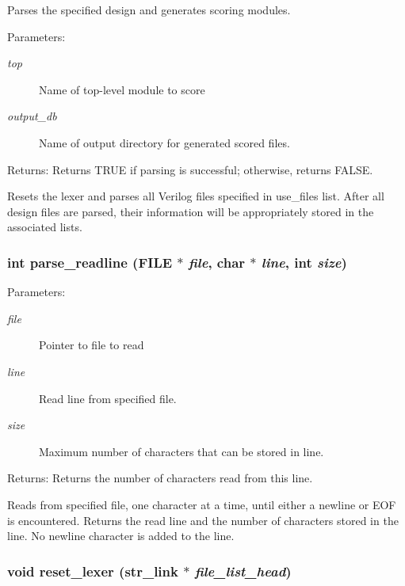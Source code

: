 Parses the specified design and generates scoring modules. 

\begin{Desc}
\item[Parameters:]
\begin{description}
\item[{\em top}]Name of top-level module to score \item[{\em output\_\-db}]Name of output directory for generated scored files.\end{description}
\end{Desc}
\begin{Desc}
\item[Returns:]Returns TRUE if parsing is successful; otherwise, returns FALSE.\end{Desc}
Resets the lexer and parses all Verilog files specified in use\_\-files list. After all design files are parsed, their information will be appropriately stored in the associated lists. 
\subsubsection{\setlength{\rightskip}{0pt plus 5cm}int parse\_\-readline (FILE $\ast$ {\em file}, char $\ast$ {\em line}, int {\em size})}\label{parse_8c_a9}


\begin{Desc}
\item[Parameters:]
\begin{description}
\item[{\em file}]Pointer to file to read \item[{\em line}]Read line from specified file. \item[{\em size}]Maximum number of characters that can be stored in line. \end{description}
\end{Desc}
\begin{Desc}
\item[Returns:]Returns the number of characters read from this line.\end{Desc}
Reads from specified file, one character at a time, until either a newline or EOF is encountered. Returns the read line and the number of characters stored in the line. No newline character is added to the line. 
\subsubsection{\setlength{\rightskip}{0pt plus 5cm}void reset\_\-lexer ({\bf str\_\-link} $\ast$ {\em file\_\-list\_\-head})}\label{parse_8c_a7}


